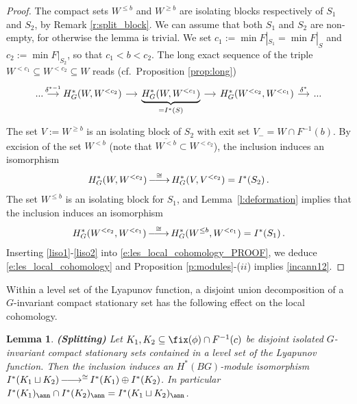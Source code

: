 \documentclass[11pt,a4paper,reqno]{article}
\DeclareMathOperator*{\ttoup}{\llongrightarrow}
\DeclareRobustCommand{\llongrightarrow}{\relbar\joinrel\relbar\joinrel\rightarrow}
\numberwithin{equation}{section}
\newtheorem{lemma}[theorem]{Lemma}
\theoremstyle{definition}
\begin{document}
\begin{proof}
The compact sets $W^{\leq b}$ and $W^{\geq b}$ are isolating blocks respectively of $ S_1 $ and $ S_2 $, by Remark \ref{r:split_block}.
We can assume that both $S_1$ and $S_2$ are non-empty, for otherwise the lemma is trivial. 
We set $c_1:=\min F|_{S_1}=\min F|_S$ and $c_2 :=\min F|_{S_2} $, so that $ c_1 < b < c_2 $. The long exact sequence of the triple $W^{<c_1}\subseteq W^{<c_2}\subseteq W$ reads (cf.~Proposition \ref{prop:long})
\begin{equation}\label{e:les_local_cohomology_PROOF}
\begin{tikzcd}[column sep=small]
...
\arrow[r,"\delta^{*-1}"] 
& 
H^*_G(W,W^{<c_2}) 
\arrow[r] 
&
\underbrace{
H^*_G(W,W^{<c_1})}_{=
I^*(S)} 
\arrow[r] 
&
H^*_G(W^{<c_2},W^{<c_1})
\arrow[r,"\delta^*"]
&
...  
\end{tikzcd}
\end{equation}
The set 
$ V:=W^{\geq b} $ is an isolating block of $ S_2$ with exit set $ V_- = W \cap F^{-1} (b)$. By excision of the set  $W^{<b}$ (note that 
$ \overline{W^{<b}}  \subset W^{<c_2}$), the inclusion induces an isomorphism
\begin{equation}
\label{liso1}
H^*_G(W,W^{<c_2})
\ttoup^{\cong}
H^*_G(V,V^{<c_2})
=
I^*(S_2) \, .
\end{equation}
The set $W^{\leq b}$ is an isolating block for $S_1$, and Lemma~\ref{l:deformation} implies that the inclusion induces an isomorphism
\begin{equation}
\label{liso2}
H^*_G(W^{<c_2},W^{<c_1})
\ttoup^{\cong}
H^*_G(W^{\leq b},W^{<c_1})
=
I^*(S_1) \, .
\end{equation}
Inserting  \eqref{liso1}-\eqref{liso2} into \eqref{e:les_local_cohomology_PROOF}, we deduce \eqref{e:les_local_cohomology} and  Proposition \ref{p:modules}-($ii$) implies \eqref{incann12}.
\end{proof}



Within a level set of the Lyapunov function, a disjoint union decomposition of a $G$-invariant compact stationary set has the following effect on the local cohomology.


\begin{lemma}
\label{l:direct_sum_local_cohomology}
{\bf (Splitting)}
Let $K_1,K_2\subseteq \fix(\phi)\cap F^{-1}(c)$ be disjoint isolated $G$-invariant compact stationary sets contained in a level set of the Lyapunov function. 
Then the inclusion induces an $H^*(BG)$-module isomorphism
$ I^*(K_1\sqcup K_2)\ttoup^{\cong} I^*(K_1)\oplus I^*(K_2) $. 
In particular
$ I^*(K_1)_\ann\cap I^*(K_2)_\ann=I^*(K_1\sqcup K_2)_\ann $. 
\end{lemma}
\end{document}
